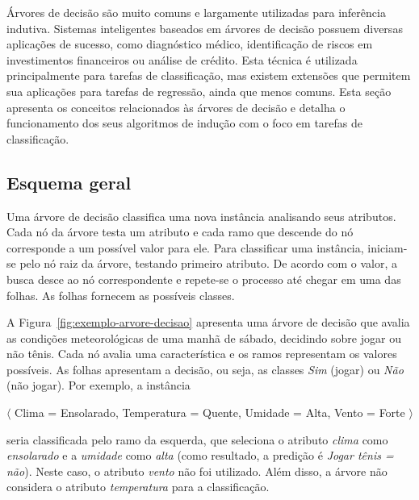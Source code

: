 Árvores de decisão são muito comuns e largamente utilizadas para inferência indutiva. Sistemas inteligentes baseados em árvores de decisão possuem diversas aplicações de sucesso, como diagnóstico médico, identificação de riscos em investimentos financeiros ou análise de crédito. Esta técnica é utilizada principalmente para tarefas de classificação, mas existem extensões que permitem sua aplicações para tarefas de regressão, ainda que menos comuns. Esta seção apresenta os conceitos relacionados às árvores de decisão e detalha o funcionamento dos seus algoritmos de indução com o foco em tarefas de classificação.

\subsection{Esquema geral}
\label{sec:arvores-decisao-esquema-geral}

Uma árvore de decisão classifica uma nova instância analisando seus atributos. Cada nó da árvore testa um atributo e cada ramo que descende do nó corresponde a um possível valor para ele. Para classificar uma instância, iniciam-se pelo nó raiz da árvore, testando primeiro atributo. De acordo com o valor, a busca desce ao nó correspondente e repete-se o processo até chegar em uma das folhas. As folhas fornecem as possíveis classes.

A Figura~\ref{fig:exemplo-arvore-decisao} apresenta uma árvore de decisão que avalia as condições meteorológicas de uma manhã de sábado, decidindo sobre jogar ou não tênis. Cada nó avalia uma característica e os ramos representam os valores possíveis. As folhas apresentam a decisão, ou seja, as classes \textit{Sim} (jogar) ou \textit{Não} (não jogar). Por exemplo, a instância
\begin{center}
	$\langle$ Clima = Ensolarado, Temperatura = Quente, Umidade = Alta, Vento = Forte $\rangle$
\end{center}
seria classificada pelo ramo da esquerda, que seleciona o atributo \textit{clima} como \textit{ensolarado} e a \textit{umidade} como \textit{alta} (como resultado, a predição é \textit{Jogar tênis = não}). Neste caso, o atributo \textit{vento} não foi utilizado. Além disso, a árvore não considera o atributo \textit{temperatura} para a classificação.

